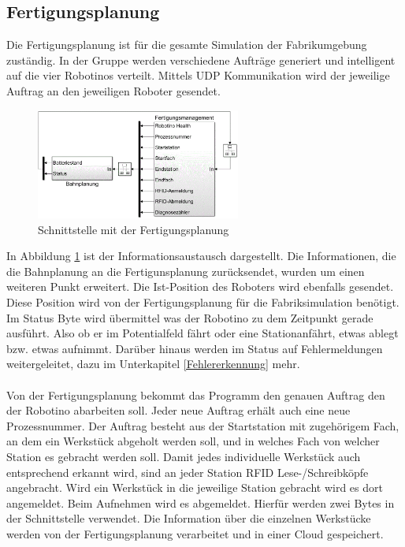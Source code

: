 \subsection{Fertigungsplanung}
Die Fertigungsplanung ist für die gesamte Simulation der Fabrikumgebung zuständig. In der Gruppe werden verschiedene Aufträge generiert und intelligent auf die vier Robotinos verteilt. Mittels UDP Kommunikation wird der jeweilige Auftrag an den jeweiligen Roboter gesendet.
\begin{figure}[h]
	\centering
	\includegraphics[width=0.6\textwidth]{Bilder/Schnittstelle_Fertigungsplanung.png}
	\caption{Schnittstelle mit der Fertigungsplanung}
	\label{pic:SchnittstelleGewerk1}
\end{figure}
\noindent
In Abbildung \ref{pic:SchnittstelleGewerk1} ist der Informationsaustausch dargestellt. Die Informationen, die die  Bahnplanung an die Fertigunsplanung zurücksendet, wurden um einen weiteren Punkt erweitert. Die Ist-Position des Roboters wird ebenfalls gesendet. Diese Position wird von der Fertigungsplanung für die Fabriksimulation benötigt. Im Status Byte wird übermittel was der Robotino zu dem Zeitpunkt gerade ausführt. Also ob er im Potentialfeld fährt oder eine Stationanfährt, etwas ablegt bzw. etwas aufnimmt. Darüber hinaus werden im Status auf Fehlermeldungen weitergeleitet, dazu im Unterkapitel \ref{Fehlererkennung} mehr.\\
\\
Von der Fertigungsplanung bekommt das Programm den genauen Auftrag den der Robotino abarbeiten soll. Jeder neue Auftrag erhält auch eine neue Prozessnummer. Der Auftrag besteht aus der Startstation mit zugehörigem Fach, an dem ein Werkstück abgeholt werden soll, und in welches Fach von welcher Station es gebracht werden soll. 
Damit jedes individuelle Werkstück auch entsprechend erkannt wird, sind an jeder Station RFID Lese-/Schreibköpfe angebracht. Wird ein Werkstück in die jeweilige Station gebracht wird es dort angemeldet. Beim  Aufnehmen wird es abgemeldet. Hierfür werden zwei Bytes in der Schnittstelle verwendet. Die Information über die einzelnen Werkstücke werden von der Fertigungsplanung verarbeitet und in einer Cloud gespeichert.\\
\newpage

